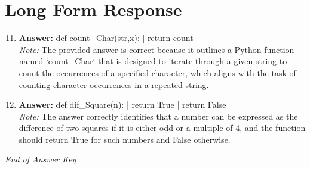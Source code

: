 \documentclass[12pt]{article}
\begin{document}
\section*{Long Form Response}
\begin{enumerate}[label=\arabic*.]
\setcounter{enumi}{10}
\item \textbf{Answer:} def count\_Char(str,x): | return count
\\ \textit{Note:} The provided answer is correct because it outlines a Python function named `count\_Char` that is designed to iterate through a given string to count the occurrences of a specified character, which aligns with the task of counting character occurrences in a repeated string.
\item \textbf{Answer:} def dif\_Square(n): | return True | return False
\\ \textit{Note:} The answer correctly identifies that a number can be expressed as the difference of two squares if it is either odd or a multiple of 4, and the function should return True for such numbers and False otherwise.
\end{enumerate}

\vfill
\noindent\textit{End of Answer Key}
\end{document}
